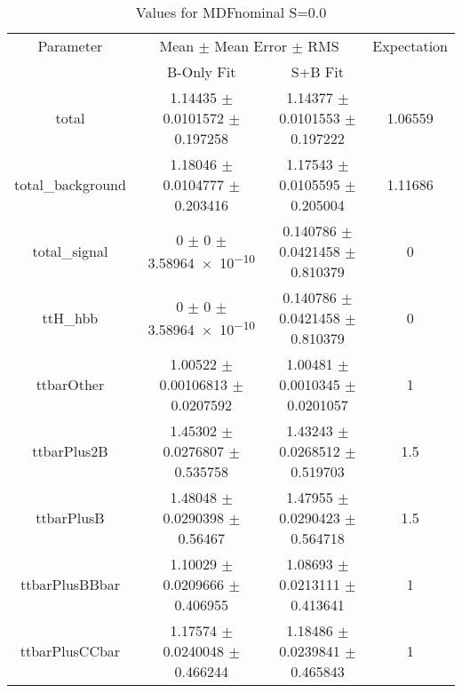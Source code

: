 \begin{table}
\centering
\caption{Values for MDFnominal S=0.0}
\begin{tabular}{cccc}
\toprule
Parameter & \multicolumn{2}{c}{Mean $\pm$ Mean Error $\pm$ RMS} & Expectation\\
 & B-Only Fit & S+B Fit & \\
\midrule
total & \num{1.14435} $\pm$ \num{0.0101572} $\pm$ \num{0.197258} & \num{1.14377} $\pm$ \num{0.0101553} $\pm$ \num{0.197222} & \num{1.06559}\\
total\_background & \num{1.18046} $\pm$ \num{0.0104777} $\pm$ \num{0.203416} & \num{1.17543} $\pm$ \num{0.0105595} $\pm$ \num{0.205004} & \num{1.11686}\\
total\_signal & \num{0} $\pm$ \num{0} $\pm$ \num{3.58964e-10} & \num{0.140786} $\pm$ \num{0.0421458} $\pm$ \num{0.810379} & \num{0}\\
ttH\_hbb & \num{0} $\pm$ \num{0} $\pm$ \num{3.58964e-10} & \num{0.140786} $\pm$ \num{0.0421458} $\pm$ \num{0.810379} & \num{0}\\
ttbarOther & \num{1.00522} $\pm$ \num{0.00106813} $\pm$ \num{0.0207592} & \num{1.00481} $\pm$ \num{0.0010345} $\pm$ \num{0.0201057} & \num{1}\\
ttbarPlus2B & \num{1.45302} $\pm$ \num{0.0276807} $\pm$ \num{0.535758} & \num{1.43243} $\pm$ \num{0.0268512} $\pm$ \num{0.519703} & \num{1.5}\\
ttbarPlusB & \num{1.48048} $\pm$ \num{0.0290398} $\pm$ \num{0.56467} & \num{1.47955} $\pm$ \num{0.0290423} $\pm$ \num{0.564718} & \num{1.5}\\
ttbarPlusBBbar & \num{1.10029} $\pm$ \num{0.0209666} $\pm$ \num{0.406955} & \num{1.08693} $\pm$ \num{0.0213111} $\pm$ \num{0.413641} & \num{1}\\
ttbarPlusCCbar & \num{1.17574} $\pm$ \num{0.0240048} $\pm$ \num{0.466244} & \num{1.18486} $\pm$ \num{0.0239841} $\pm$ \num{0.465843} & \num{1}\\
\bottomrule
\end{tabular}
\end{table}